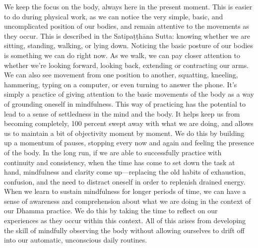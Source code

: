 We keep the focus on the body, always here in the present moment. This 
is easier to do during physical work, as we can notice the very simple, 
basic, and uncomplicated position of our bodies, and remain attentive 
to the movements as they occur. This is described in the 
Satipaṭṭhāna Sutta: knowing whether we are sitting, standing, 
walking, or lying down. Noticing the basic posture of our bodies is 
something we can do right now. As we walk, we can pay closer attention 
to whether we're looking forward, looking back, extending or 
contracting our arms. We can also see movement from one position to 
another, squatting, kneeling, hammering, typing on a computer, or even 
turning to answer the phone. It's simply a practice of giving attention 
to the basic movements of the body as a way of grounding oneself in 
mindfulness. This way of practicing has the potential to lead to a 
sense of settledness in the mind and the body. It helps keep us from 
becoming completely, 100 percent swept away with what we are doing, and 
allows us to maintain a bit of objectivity moment by moment. We do this 
by building up a momentum of pauses, stopping every now and again and 
feeling the presence of the body. In the long run, if we are able to 
successfully practice with continuity and consistency, when the time 
has come to set down the task at hand, mindfulness and clarity come 
up---replacing the old habits of exhaustion, confusion, and the need to 
distract oneself in order to replenish drained energy. When we learn to 
sustain mindfulness for longer periods of time, we can have a sense of 
awareness and comprehension about what we are doing in the context of 
our Dhamma practice. We do this by taking the time to reflect on our 
experiences as they occur within this context. All of this arises from 
developing the skill of mindfully observing the body without allowing 
ourselves to drift off into our automatic, unconscious daily routines.

